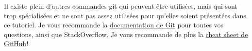\documentclass{book}
\begin{document}
Il existe plein d'autres commandes git qui peuvent être utilisées, mais qui sont trop spécialisées et ne sont pas assez utilisées pour qu'elles soient présentées dans ce tutoriel. Je vous recommande la \href{https://git-scm.com/docs}{documentation de Git} pour toutes vos questions, ainsi que StackOverflow. Je vous recommande de plus la \href{https://training.github.com/downloads/fr/github-git-cheat-sheet.pdf}{cheat sheet de GitHub}!
\end{document}
